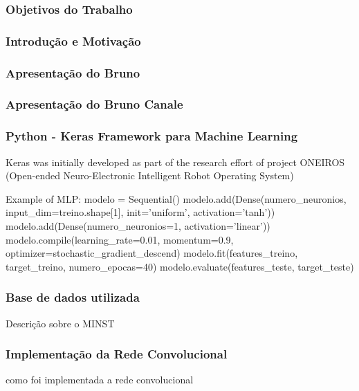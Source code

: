 \documentclass[11pt]{beamer}
\begin{document}
	\frame[plain]{\maketitle}

    \begin{frame}
      \frametitle{Objetivos do Trabalho}
    \end{frame}

    \begin{frame}
      \frametitle{Introdução e Motivação}
    \end{frame}

    \begin{frame}
      \frametitle{Apresentação do Bruno}
    \end{frame}

    \begin{frame}
      \frametitle{Apresentação do Bruno Canale}
    \end{frame}

	\begin{frame}
      \frametitle{Python - Keras Framework para Machine Learning}
      Keras was initially developed as part of the research effort of
      project ONEIROS (Open-ended Neuro-Electronic Intelligent Robot
      Operating System)

      Example of MLP:
      modelo = Sequential()
      modelo.add(Dense(numero_neuronios, input_dim=treino.shape[1],
      init='uniform', activation='tanh'))
      modelo.add(Dense(numero_neuronios=1, activation='linear'))
      modelo.compile(learning_rate=0.01, momentum=0.9,
      optimizer=stochastic_gradient_descend)
      modelo.fit(features_treino, target_treino, numero_epocas=40)
      modelo.evaluate(features_teste, target_teste)
      
    \end{frame}

    \begin{frame}
      \frametitle{Base de dados utilizada}

      Descrição sobre o MINST
    \end{frame}

    \begin{frame}
      \frametitle{Implementação da Rede Convolucional}
      como foi implementada a rede convolucional
    \end{frame}
\end{document}
